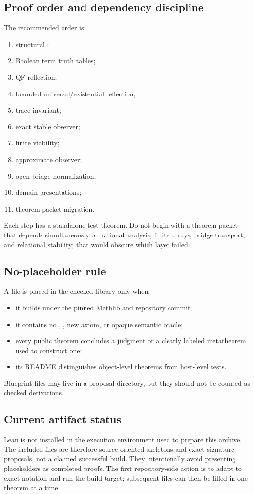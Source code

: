 \subsection{Proof order and dependency discipline}

The recommended order is:

\begin{enumerate}
\item structural ;
\item Boolean term truth tables;
\item QF reflection;
\item bounded universal/existential reflection;
\item trace invariant;
\item exact stable observer;
\item finite viability;
\item approximate observer;
\item open bridge normalization;
\item domain presentations;
\item theorem-packet migration.
\end{enumerate}

Each step has a standalone test theorem.  Do not begin with a theorem packet
that depends simultaneously on rational analysis, finite arrays, bridge
transport, and relational stability; that would obscure which layer failed.

\subsection{No-placeholder rule}

A file is placed in the checked library only when:
\begin{itemize}
\item it builds under the pinned Mathlib and repository commit;
\item it contains no , , new axiom, or opaque semantic
oracle;
\item every public theorem concludes a  judgment or a clearly
labeled metatheorem used to construct one;
\item its README distinguishes object-level theorems from host-level tests.
\end{itemize}

Blueprint files may live in a proposal directory, but they should not be
counted as checked derivations.

\subsection{Current artifact status}

Lean is not installed in the execution environment used to prepare this
archive.  The included  files are therefore source-oriented
skeletons and exact signature proposals, not a claimed successful build.
They intentionally avoid presenting placeholders as completed proofs.  The
first repository-side action is to adapt  to exact notation
and run the build target; subsequent files can then be filled in one theorem
at a time.
